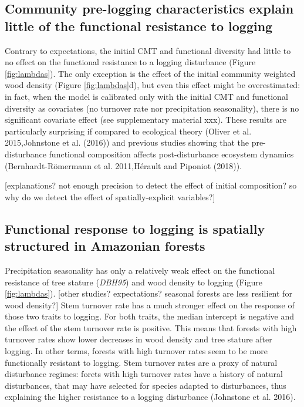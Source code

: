 \documentclass[]{elsarticle} %
\begin{document}
\subsection{Community pre-logging characteristics explain little of the
functional resistance to
logging}\label{community-pre-logging-characteristics-explain-little-of-the-functional-resistance-to-logging}

Contrary to expectations, the initial CMT and functional diversity had
little to no effect on the functional resistance to a logging
disturbance (Figure \ref{fig:lambdas}). The only exception is the effect
of the initial community weighted wood density (Figure
\ref{fig:lambdas}d), but even this effect might be overestimated: in
fact, when the model is calibrated only with the initial CMT and
functional diversity as covariates (no turnover rate nor precipitation
seasonality), there is no significant covariate effect (see
supplementary material xxx). These results are particularly surprising
if compared to ecological theory (Oliver et al. 2015,Johnstone et al.
(2016)) and previous studies showing that the pre-disturbance functional
composition affects post-disturbance ecosystem dynamics
(Bernhardt-Römermann et al. 2011,Hérault and Piponiot (2018)).

{[}explanations? not enough precision to detect the effect of initial
composition? so why do we detect the effect of spatially-explicit
variables?{]}

\subsection{Functional response to logging is spatially structured in
Amazonian
forests}\label{functional-response-to-logging-is-spatially-structured-in-amazonian-forests}

Precipitation seasonality has only a relatively weak effect on the
functional resistance of tree stature (\emph{DBH95}) and wood density to
logging (Figure \ref{fig:lambdas}). {[}other studies? expectations?
seasonal forests are less resilient for wood density?{]} Stem turnover
rate has a much stronger effect on the response of those two traits to
logging. For both traits, the median intercept is negative and the
effect of the stem turnover rate is positive. This means that forests
with high turnover rates show lower decreases in wood density and tree
stature after logging. In other terms, forests with high turnover rates
seem to be more functionally resistant to logging. Stem turnover rates
are a proxy of natural disturbance regimes: forets with high turnover
rates have a history of natural disturbances, that may have selected for
species adapted to disturbances, thus explaining the higher resistance
to a logging disturbance (Johnstone et al. 2016).
\end{document}
